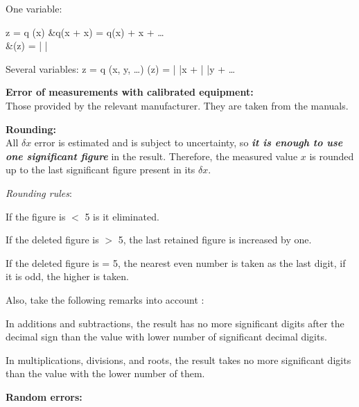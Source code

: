 		\bi 
			\item One variable: 
				\be\begin{split}
					z = q (x) 
					&\quad\rightarrow\quad q\left(x + \Delta x\right) = q(x) + \Delta x + \dots \\
					&\quad\rightarrow\quad \delta(z) = \left| \frac{\delta q}{\delta x} \right|
				\end{split}\ee
			\item Several variables:
				\be z = q (x, y, \dots) \quad\rightarrow\quad 
					\delta(z) = \left|  \right|\delta x + 
								\left|  \right|\delta y + \dots
				\ee
		\ei
	\ei

	\item \textbf{Error of measurements with calibrated equipment:}\\[12pt]
Those provided by the relevant manufacturer. They are taken from the manuals.

	\item \textbf{Rounding:}\\[12pt]
All $\delta x$ error is estimated and is subject to uncertainty, so \textbf{\textit{it is enough to use one significant figure}} in the result. Therefore, the measured value $x$ is rounded up to the last significant figure present in its $\delta x$.

	\bi 
		\item \textit{Rounding rules}:
		\bi
			\item If the figure is $<$ 5 is it eliminated.
			\item If the deleted figure is $>$ 5, the last retained figure is increased by one.
			\item If the deleted figure is = 5, the nearest even number is taken as the last digit, if it is odd, the higher is taken.
		\ei

		\item Also, take the following remarks into account \cite{san:89}:
		\bi
			\item In additions and subtractions, the result has no more significant digits after the decimal sign than the value with lower number of significant decimal digits.
			\item In multiplications, divisions, and roots, the result takes no more significant digits than the value with the lower number of them.
		\ei
	\ei


	\item \textbf{Random errors:}\\[12pt]


